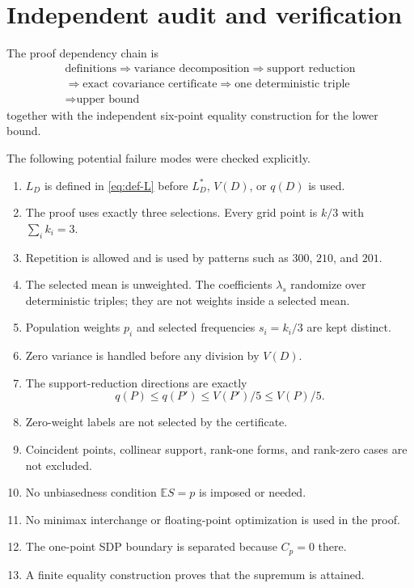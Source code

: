 \documentclass[11pt]{article}
\theoremstyle{definition}
\theoremstyle{remark}
\newcommand{\E}{\mathbb{E}}
\begin{document}
\section{Independent audit and verification}

The proof dependency chain is
\[
\boxed{
\begin{gathered}
\text{definitions}
\Longrightarrow
\text{variance decomposition}
\Longrightarrow
\text{support reduction}\\
\Longrightarrow
\text{exact covariance certificate}
\Longrightarrow
\text{one deterministic triple}\\
\Longrightarrow
\text{upper bound}
\end{gathered}
}
\]
together with the independent six-point equality construction for the lower bound.

The following potential failure modes were checked explicitly.

\begin{enumerate}[leftmargin=*,label=\arabic*.]
\item $L_D$ is defined in \eqref{eq:def-L} before $L_D^*$, $V(D)$, or $q(D)$ is used.
\item The proof uses exactly three selections.  Every grid point is $k/3$ with $\sum_i k_i=3$.
\item Repetition is allowed and is used by patterns such as $300$, $210$, and $201$.
\item The selected mean is unweighted.  The coefficients $\lambda_s$ randomize over deterministic triples; they are not weights inside a selected mean.
\item Population weights $p_i$ and selected frequencies $s_i=k_i/3$ are kept distinct.
\item Zero variance is handled before any division by $V(D)$.
\item The support-reduction directions are exactly
\[
q(P)\le q(P')\le V(P')/5\le V(P)/5.
\]
\item Zero-weight labels are not selected by the certificate.
\item Coincident points, collinear support, rank-one forms, and rank-zero cases are not excluded.
\item No unbiasedness condition $\E S=p$ is imposed or needed.
\item No minimax interchange or floating-point optimization is used in the proof.
\item The one-point SDP boundary is separated because $C_p=0$ there.
\item A finite equality construction proves that the supremum is attained.
\end{enumerate}
\end{document}
